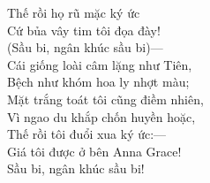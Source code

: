 Thế rồi họ rũ mặc ký ức\\
\indent
Cứ bủa vây tim tôi đọa đày!\\
(Sầu bi, ngân khúc sầu bi)—\\
\indent
Cái giống loài câm lặng như Tiên,\\
Bệch như khóm hoa ly nhợt màu;\\
\indent
Mặt trắng toát tôi cũng điềm nhiên,\\
\indent
Vì ngao du khắp chốn huyền hoặc,\\
Thế rồi tôi đuổi xua ký ức:—\\
\indent
Giá tôi được ở bên Anna Grace!\\
Sầu bi, ngân khúc sầu bi!